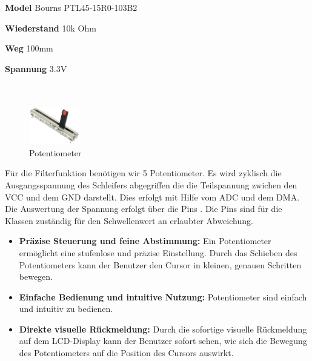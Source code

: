 \textbf{Model} Bourns PTL45-15R0-103B2

\textbf{Wiederstand} 10k Ohm

\textbf{Weg} 100mm

\textbf{Spannung} 3.3V \\ \\ \\

	\begin{figure} %
	\vspace{-155pt + 0.02\textwidth}
	\hspace{0.07\textwidth} %
	\includegraphics[width=0.2\textwidth]{images/05_technische_spezifikation/Interface/Potentiometer.png} %
	\caption{Potentiometer}
	\label{fig:schiebe_potentiometer}
	\vspace{-20pt}
\end{figure}

Für die Filterfunktion benötigen wir 5 Potentiometer. Es wird zyklisch die Ausgangsspannung des Schleifers abgegriffen die die Teilspannung zwichen den VCC und dem GND darstellt. Dies erfolgt mit Hilfe vom ADC und dem DMA. Die Auswertung der Spannung erfolgt über die Pins  . Die Pins   sind für die Klassen zuständig   für den Schwellenwert an erlaubter Abweichung.

\begin{itemize}
	\item \textbf{Präzise Steuerung und feine Abstimmung:} Ein Potentiometer ermöglicht eine stufenlose und präzise Einstellung. Durch das Schieben des Potentiometers kann der Benutzer den Cursor in kleinen, genauen Schritten bewegen.
	\item \textbf{Einfache Bedienung und intuitive Nutzung:} Potentiometer sind einfach und intuitiv zu bedienen.
	\item \textbf{Direkte visuelle Rückmeldung:} Durch die sofortige visuelle Rückmeldung auf dem LCD-Display kann der Benutzer sofort sehen, wie sich die Bewegung des Potentiometers auf die Position des Cursors auswirkt.
\end{itemize}

